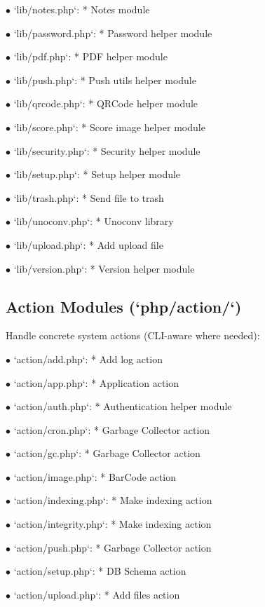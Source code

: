 \documentclass[a4paper]{article}
\begin{document}
\begin{compactitem}
\item[\color{myblue}$\bullet$] `lib/notes.php`: * Notes module
\item[\color{myblue}$\bullet$] `lib/password.php`: * Password helper module
\item[\color{myblue}$\bullet$] `lib/pdf.php`: * PDF helper module
\item[\color{myblue}$\bullet$] `lib/push.php`: * Push utils helper module
\item[\color{myblue}$\bullet$] `lib/qrcode.php`: * QRCode helper module
\item[\color{myblue}$\bullet$] `lib/score.php`: * Score image helper module
\item[\color{myblue}$\bullet$] `lib/security.php`: * Security helper module
\item[\color{myblue}$\bullet$] `lib/setup.php`: * Setup helper module
\item[\color{myblue}$\bullet$] `lib/trash.php`: * Send file to trash
\item[\color{myblue}$\bullet$] `lib/unoconv.php`: * Unoconv library
\item[\color{myblue}$\bullet$] `lib/upload.php`: * Add upload file
\item[\color{myblue}$\bullet$] `lib/version.php`: * Version helper module
\end{compactitem}

\hypertarget{toc10}{}
\subsection{Action Modules (`php/action/`)}

Handle concrete system actions (CLI-aware where needed):

\begin{compactitem}
\item[\color{myblue}$\bullet$] `action/add.php`: * Add log action
\item[\color{myblue}$\bullet$] `action/app.php`: * Application action
\item[\color{myblue}$\bullet$] `action/auth.php`: * Authentication helper module
\item[\color{myblue}$\bullet$] `action/cron.php`: * Garbage Collector action
\item[\color{myblue}$\bullet$] `action/gc.php`: * Garbage Collector action
\item[\color{myblue}$\bullet$] `action/image.php`: * BarCode action
\item[\color{myblue}$\bullet$] `action/indexing.php`: * Make indexing action
\item[\color{myblue}$\bullet$] `action/integrity.php`: * Make indexing action
\item[\color{myblue}$\bullet$] `action/push.php`: * Garbage Collector action
\item[\color{myblue}$\bullet$] `action/setup.php`: * DB Schema action
\item[\color{myblue}$\bullet$] `action/upload.php`: * Add files action
\end{compactitem}
\end{document}

